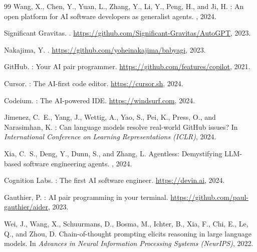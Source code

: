 \documentclass{article}
\begin{document}
{\begin{thebibliography}{99}
Wang, X., Chen, Y., Yuan, L., Zhang, Y., Li, Y., Peng, H., and Ji,
H.
: An open platform for {AI} software developers as
  generalist agents.
, 2024.

{Significant Gravitas}.
.
\newblock \url{https://github.com/Significant-Gravitas/AutoGPT}, 2023.

Nakajima, Y.
.
\newblock \url{https://github.com/yoheinakajima/babyagi}, 2023.

{GitHub}.
: Your {AI} pair programmer.
\newblock \url{https://github.com/features/copilot}, 2021.

{Cursor}.
: The {AI}-first code editor.
\newblock \url{https://cursor.sh}, 2024.

{Codeium}.
: The {AI}-powered {IDE}.
\newblock \url{https://windsurf.com}, 2024.

Jimenez, C.~E., Yang, J., Wettig, A., Yao, S., Pei, K., Press, O.,
and Narasimhan, K.
: Can language models resolve real-world {GitHub}
  issues?
\newblock In {\em International Conference on Learning
  Representations (ICLR)}, 2024.

Xia, C.~S., Deng, Y., Dunn, S., and Zhang, L.
\newblock Agentless: Demystifying {LLM}-based software engineering
  agents.
, 2024.

{Cognition Labs}.
: The first {AI} software engineer.
\newblock \url{https://devin.ai}, 2024.

Gauthier, P.
: {AI} pair programming in your terminal.
\newblock \url{https://github.com/paul-gauthier/aider}, 2023.

Wei, J., Wang, X., Schuurmans, D., Bosma, M., Ichter, B., Xia, F.,
Chi, E., Le, Q., and Zhou, D.
\newblock Chain-of-thought prompting elicits reasoning in large
  language models.
\newblock In {\em Advances in Neural Information Processing Systems
  (NeurIPS)}, 2022.


\end{thebibliography}}
\end{document}
